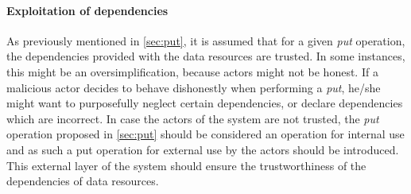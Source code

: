\paragraph{Exploitation of dependencies} 
As previously mentioned in \autoref{sec:put}, it is assumed that for a given \emph{put} operation, the dependencies provided with the data resources are trusted. In some instances, this might be an oversimplification, because actors might not be honest. If a malicious actor decides to behave dishonestly when performing a \emph{put}, he/she might want to purposefully neglect certain dependencies, or declare dependencies which are incorrect. In case the actors of the system are not trusted, the \emph{put} operation proposed in \autoref{sec:put} should be considered an operation for internal use and as such a put operation for external use by the actors should be introduced. This external layer of the system should ensure the trustworthiness of the dependencies of data resources.